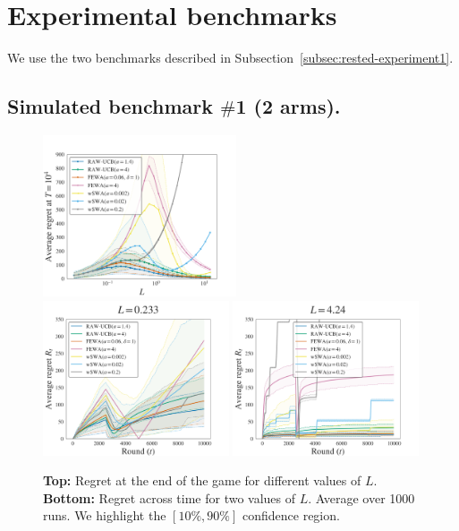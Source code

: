 \section{Experimental benchmarks}
\label{sec:rested-experiment}
We use the two benchmarks described in Subsection~\ref{subsec:rested-experiment1}.

\subsection{Simulated benchmark $\#$1 (2 arms).}
\begin{figure}[ht]
\centering
\includegraphics[clip, width= 0.51\textwidth]{3Rested/fig/fig1A_main.pdf}
\includegraphics[clip, width= 0.49\textwidth]{3Rested/fig/fig1B_main.pdf}
\includegraphics[clip, width= 0.49\textwidth]{3Rested/fig/fig1C_main.pdf}
\caption{\textbf{Top:} Regret at the end of the game for different values of $L$. \textbf{Bottom:} Regret across time for two values of $L$. Average over 1000 runs. We highlight the $\left[10\%, 90\%\right]$ confidence region.}
\label{fig:rested-exp1}
\end{figure}

